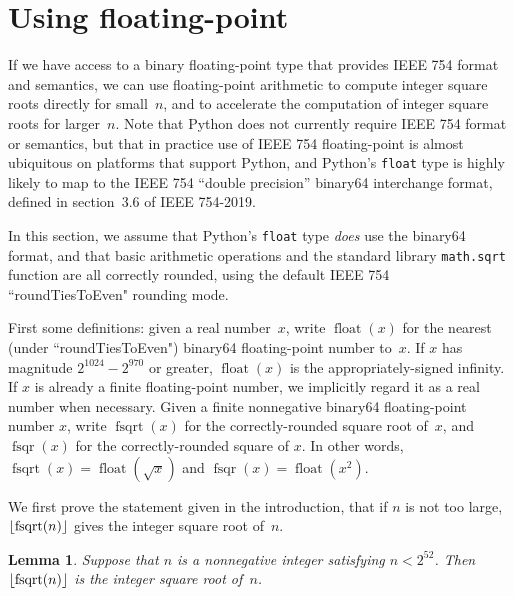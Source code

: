 \documentclass[a4paper]{article}
\DeclarePairedDelimiter\floor{\lfloor}{\rfloor}
\DeclareMathOperator{\fsqrt}{fsqrt}
\DeclareMathOperator{\fsqr}{fsqr}
\DeclareMathOperator{\float}{float}
\theoremstyle{plain}
\newtheorem{lemma}[theorem]{Lemma}
\theoremstyle{definition}
\begin{document}





\section{Using floating-point}

If we have access to a binary floating-point type that provides IEEE 754 format
and semantics, we can use floating-point arithmetic to compute integer square
roots directly for small~$n$, and to accelerate the computation of integer
square roots for larger~$n$. Note that Python does not currently require IEEE
754 format or semantics, but that in practice use of IEEE 754 floating-point is
almost ubiquitous on platforms that support Python, and Python's
\lstinline{float} type is highly likely to map to the IEEE 754
``double precision'' binary64 interchange format, defined in section~3.6 of
IEEE 754-2019.

In this section, we assume that Python's \lstinline{float} type \emph{does} use
the binary64 format, and that basic arithmetic operations and the standard
library \lstinline{math.sqrt} function are all correctly rounded, using the
default IEEE 754 ``roundTiesToEven" rounding mode.

First some definitions: given a real number~$x$, write $\float(x)$ for the
nearest (under ``roundTiesToEven") binary64 floating-point number to~$x$. If
$x$ has magnitude $2^{1024} - 2^{970}$ or greater, $\float(x)$ is the
appropriately-signed infinity. If $x$ is already a finite floating-point
number, we implicitly regard it as a real number when necessary. Given a finite
nonnegative binary64 floating-point number $x$, write $\fsqrt(x)$ for the
correctly-rounded square root of~$x$, and $\fsqr(x)$ for the correctly-rounded
square of $x$. In other words, $\fsqrt(x) = \float(\sqrt x)$ and $\fsqr(x) =
\float(x^2)$.

We first prove the statement given in the introduction, that if $n$ is
not too large, $\floor{\fsqrt(n)}$ gives the integer square root of~$n$.

\begin{lemma}
  Suppose that $n$ is a nonnegative integer satisfying $n < 2^{52}$. Then
  $\floor{\fsqrt(n)}$ is the integer square root of~$n$.
\end{lemma}
\end{document}
